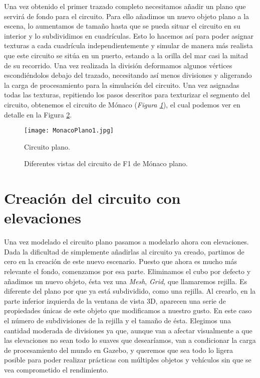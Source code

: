 Una vez obtenido el primer trazado completo necesitamos añadir un plano que servirá de fondo para el circuito. Para ello añadimos un nuevo objeto plano a la escena, lo aumentamos de tamaño hasta que se pueda situar el circuito en su interior y lo subdividimos en cuadrículas. Esto lo hacemos así para poder asignar texturas a cada cuadrícula independientemente y simular de manera más realista que este circuito se sitúa en un puerto, estando a la orilla del mar casi la mitad de su recorrido. Una vez realizada la división deformamos algunos vértices escondiéndolos debajo del trazado, necesitando así menos divisiones y aligerando la carga de procesamiento para la simulación del circuito. Una vez asignadas todas las texturas, repitiendo los pasos descritos para texturizar el segmento del circuito, obtenemos el circuito de Mónaco (\textit{Figura \ref{fig:monacoplano1}}), el cual podemos ver en detalle en la Figura \ref{fig:monacoplanovistas}.

\begin{figure}[t]
	\centering
	\texttt{[image: MonacoPlano1.jpg]}
	\caption{Circuito plano.} \label{fig:monacoplano1}
\end{figure}

\begin{figure}
	\centering
	\hspace{0.02\textwidth}	
	\vspace{0.01\textwidth}
	\hspace{0.02\textwidth}
	\caption{Diferentes vistas del circuito de F1 de Mónaco plano.} \label{fig:monacoplanovistas}
\end{figure}


\section{Creación del circuito con elevaciones}
\label{sec:circarr_circuitoconelevaciones}

Una vez modelado el circuito plano pasamos a modelarlo ahora con elevaciones. Dada la dificultad de simplemente añadirlas al circuito ya creado, partimos de cero en la creación de este nuevo escenario. Puesto que ahora es mucho más relevante el fondo, comenzamos por esa parte. Eliminamos el cubo por defecto y añadimos un nuevo objeto, ésta vez una \textit{Mesh}, \textit{Grid}, que llamaremos rejilla. Es diferente del plano por que ya está subdividido, como una rejilla. Al crearlo, en la parte inferior izquierda de la ventana de vista 3D, aparecen una serie de propiedades únicas de este objeto que modificamos a nuestro gusto. En este caso el número de subdivisiones de la rejilla y el tamaño de ésta. Elegimos una cantidad moderada de divisiones ya que, aunque van a afectar visualmente a que las elevaciones no sean todo lo suaves que desearíamos, van a condicionar la carga de procesamiento del mundo en Gazebo, y queremos que sea todo lo ligera posible para poder realizar prácticas con múltiples objetos y vehículos sin que se vea comprometido el rendimiento.

